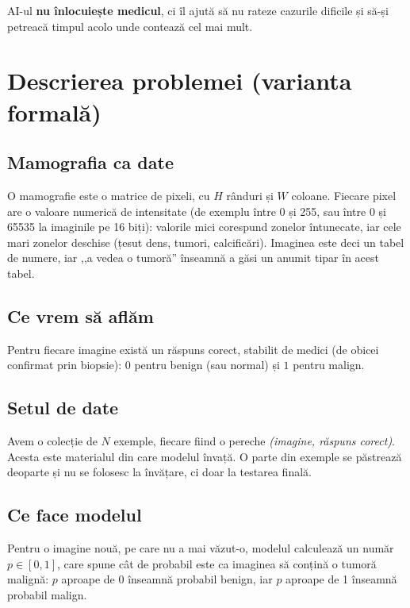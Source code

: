 \documentclass[runningheads,a4paper,11pt]{report}
\begin{document}
AI-ul \textbf{nu înlocuiește medicul}, ci îl ajută să nu rateze cazurile dificile și să-și petreacă timpul acolo unde contează cel mai mult.

\section{Descrierea problemei (varianta formală)}
\label{section:problemFormal}

\subsection{Mamografia ca date}

O mamografie este o matrice de pixeli, cu $H$ rânduri și $W$ coloane. Fiecare pixel are o valoare numerică de intensitate (de exemplu între 0 și 255, sau între 0 și 65535 la imaginile pe 16 biți): valorile mici corespund zonelor întunecate, iar cele mari zonelor deschise (țesut dens, tumori, calcificări). Imaginea este deci un tabel de numere, iar ,,a vedea o tumoră'' înseamnă a găsi un anumit tipar în acest tabel.

\subsection{Ce vrem să aflăm}

Pentru fiecare imagine există un răspuns corect, stabilit de medici (de obicei confirmat prin biopsie): $0$ pentru benign (sau normal) și $1$ pentru malign.

\subsection{Setul de date}

Avem o colecție de $N$ exemple, fiecare fiind o pereche \emph{(imagine, răspuns corect)}. Acesta este materialul din care modelul învață. O parte din exemple se păstrează deoparte și nu se folosesc la învățare, ci doar la testarea finală.

\subsection{Ce face modelul}

Pentru o imagine nouă, pe care nu a mai văzut-o, modelul calculează un număr $p \in [0,1]$, care spune cât de probabil este ca imaginea să conțină o tumoră malignă: $p$ aproape de 0 înseamnă probabil benign, iar $p$ aproape de 1 înseamnă probabil malign.
\end{document}
